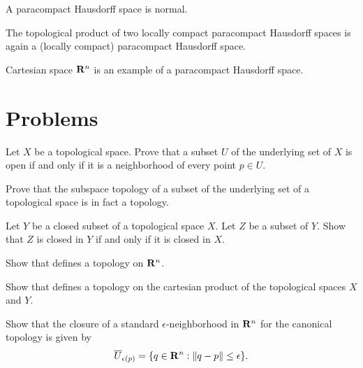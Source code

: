 \begin{prop}
  \label{prop:paracompact_spaces}
  A paracompact Hausdorff space is normal.
\end{prop}

\begin{thm}
  The topological product of two locally compact paracompact Hausdorff spaces
  is again a (locally compact) paracompact Hausdorff space. 
\end{thm}

Cartesian space $\mathbf{R}^n$ is an example of a paracompact Hausdorff space.

\section{Problems}

\begin{xca}
  Let $X$ be a topological space. Prove that a subset $U$ of the underlying set
  of $X$ is open if and only if it is a neighborhood of every point $p \in U$.
\end{xca}

\begin{xca}
  Prove that the subspace topology of a subset of the underlying set of a topological
  space is in fact a topology.
\end{xca}

\begin{xca}
  Let $Y$ be a closed subset of a topological space $X$. Let $Z$ be a subset of
  $Y$. Show that $Z$ is closed in $Y$ if and only if it is closed in $X$.
\end{xca}

\begin{xca}
  Show that  defines a topology on $\mathbf{R}^n$.
\end{xca}

\begin{xca}
  Show that  defines a topology on the cartesian
  product of the topological spaces $X$ and $Y$.
\end{xca}

\begin{xca}
  Show that the closure of a standard $\epsilon$-neighborhood in $\mathbf{R}^n$
  for the canonical topology is given by
  \begin{equation}
    \overline U_{\epsilon(p)} = \lbrace q \in \mathbf{R}^n : \lVert q - p\rVert \leq \epsilon\rbrace.
  \end{equation}
\end{xca}

